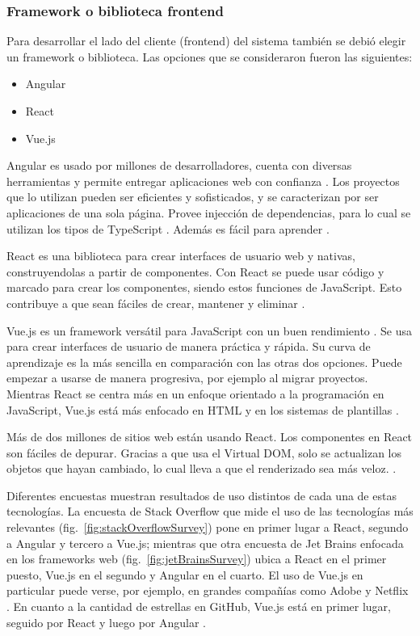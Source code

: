 \documentclass{article}
\begin{document}
\subsubsection{Framework o biblioteca frontend}
Para desarrollar el lado del cliente (frontend) del sistema también se debió elegir un framework o biblioteca. Las opciones que se consideraron fueron las siguientes:
\begin{itemize}
    \item Angular
    \item React
    \item Vue.js
\end{itemize}
 Angular es usado por millones de desarrolladores, cuenta con diversas herramientas y permite entregar aplicaciones web con confianza \parencite{angularHome}. Los proyectos que lo utilizan pueden ser eficientes y sofisticados, y se caracterizan por ser aplicaciones de una sola página. Provee injección de dependencias, para lo cual se utilizan los tipos de TypeScript \parencite{angularDocsIntroduction}. Además es fácil para aprender \parencite{w3schoolsAngular}. 

 React es una biblioteca para crear interfaces de usuario web y nativas, construyendolas a partir de componentes. Con React se puede usar código y marcado para crear los componentes, siendo estos funciones de JavaScript. Esto contribuye a que sean fáciles de crear, mantener y eliminar \parencite{reactOfficialHome}.

 Vue.js es un framework versátil para JavaScript con un buen rendimiento \parencite{vueOfficialHome}. Se usa para crear interfaces de usuario de manera práctica y rápida. Su curva de aprendizaje es la más sencilla en comparación con las otras dos opciones. Puede empezar a usarse de manera progresiva, por ejemplo al migrar proyectos. Mientras React se centra más en un enfoque orientado a la programación en JavaScript, Vue.js está más enfocado en HTML y en los sistemas de plantillas \parencite{manz}.

Más de dos millones de sitios web están usando React. Los componentes en React son fáciles de depurar. Gracias a que usa el Virtual DOM, solo se actualizan los objetos que hayan cambiado, lo cual lleva a que el renderizado sea más veloz.  \parencite{galikReact}.

Diferentes encuestas muestran resultados de uso distintos de cada una de estas tecnologías. La encuesta de Stack Overflow que mide el uso de las tecnologías más relevantes (fig.~\ref{fig:stackOverflowSurvey}) pone en primer lugar a React, segundo a Angular y tercero a Vue.js; mientras que otra encuesta de Jet Brains enfocada en los frameworks web (fig.~\ref{fig:jetBrainsSurvey}) ubica a React en el primer puesto, Vue.js en el segundo y Angular en el cuarto. El uso de Vue.js en particular puede verse, por ejemplo, en grandes compañías como Adobe y Netflix \parencite{scalablepathVue}. En cuanto a la cantidad de estrellas en GitHub, Vue.js está en primer lugar, seguido por React y luego por Angular \parencite{codeinwp}.
\end{document}
